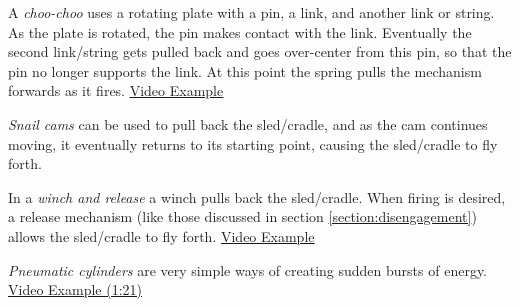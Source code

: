 \documentclass[10pt,letterpaper]{book}
\begin{document}
\begin{asparaenum}[a)]
\item A \textit{choo-choo} uses a rotating plate with a pin, a link, and another link or string. As the plate is rotated, the pin makes contact with the link. Eventually the second link/string gets pulled back and goes over-center from this pin, so that the pin no longer supports the link. At this point the spring pulls the mechanism forwards as it fires. \href{https://www.youtube.com/watch?v=Kh-PVMSF7VU}{\color{red}\underline{Video Example}}

\item \textit{Snail cams} can be used to pull back the sled/cradle, and as the cam continues moving, it eventually returns to its starting point, causing the sled/cradle to fly forth.

\item In a \textit{winch and release} a winch pulls back the sled/cradle. When firing is desired, a release mechanism (like those discussed in section \ref{section:disengagement}) allows the sled/cradle to fly forth. \href{https://www.youtube.com/watch?v=YFmG_b4B-BE}{\color{red}\underline{Video Example}}

\item \textit{Pneumatic cylinders} are very simple ways of creating sudden bursts of energy. \href{https://youtu.be/1QOYdA5IPJQ?t=81}{\color{red}\underline{Video Example (1:21)}}
\end{asparaenum}

\end{document}
